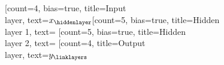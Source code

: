 \documentclass{standalone}
\begin{document}
	\begin{neuralnetwork}[height=6.5]
		\newcommand{\nodetextclear}[2]{}
		\newcommand{\nodetextx}[2]{$x_#2$}
		\newcommand{\nodetexty}[2]{$y_#2$}
		[count=4, bias=true, title=Input\\layer, text=\nodetextx]
		\hiddenlayer[count=5, bias=true, title=Hidden\\layer 1, text=\nodetextclear]
    \linklayers
    \hiddenlayer[count=5, bias=true, title=Hidden\\layer 2, text=\nodetextclear]
    \linklayers
		\outputlayer[count=4, title=Output\\layer, text=\nodetexty] 
    \linklayers
	\end{neuralnetwork}
\end{document}
